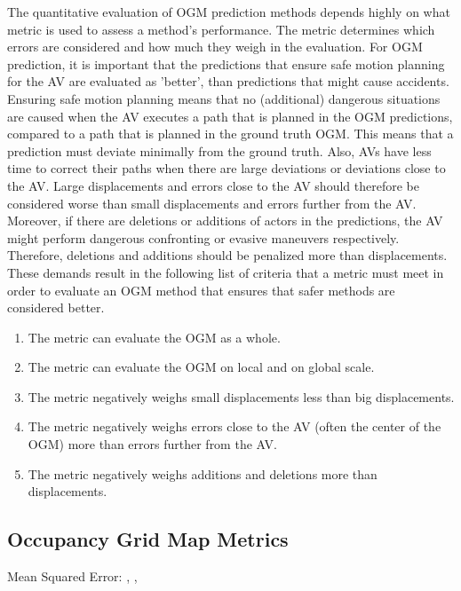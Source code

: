 The quantitative evaluation of \gls{OGM} prediction methods depends highly on what metric is used to assess a method's performance. The metric determines which errors are considered and how much they weigh in the evaluation. For \gls{OGM} prediction, it is important that the predictions that ensure safe motion planning for the \gls{AV} are evaluated as 'better', than predictions that might cause accidents. Ensuring safe motion planning means that no (additional) dangerous situations are caused when the \gls{AV} executes a path that is planned in the \gls{OGM} predictions, compared to a path that is planned in the ground truth \gls{OGM}. This means that a prediction must deviate minimally from the ground truth. Also, \glspl{AV} have less time to correct their paths when there are large deviations or deviations close to the \gls{AV}. Large displacements and errors close to the \gls{AV} should therefore be considered worse than small displacements and errors further from the \gls{AV}. Moreover, if there are deletions or additions of actors in the predictions, the \gls{AV} might perform dangerous confronting or evasive maneuvers respectively. Therefore, deletions and additions should be penalized more than displacements. These demands result in the following list of criteria that a metric must meet in order to evaluate an \gls{OGM} method that ensures that safer methods are considered better.  

\begin{enumerate}
	\item The metric can evaluate the \gls{OGM} as a whole.
	\item The metric can evaluate the \gls{OGM} on local and on global scale.
	\item The metric negatively weighs small displacements less than big displacements. 
	\item The metric negatively weighs errors close to the \gls{AV} (often the center of the \gls{OGM}) more than errors further from the \gls{AV}.
	\item The metric negatively weighs additions and deletions more than displacements.
\end{enumerate}


\subsection{Occupancy Grid Map Metrics}

Mean Squared Error: \cite{lange2020attention}, \cite{itkina2019dynamic}, \cite{toyungyernsub2020double}

